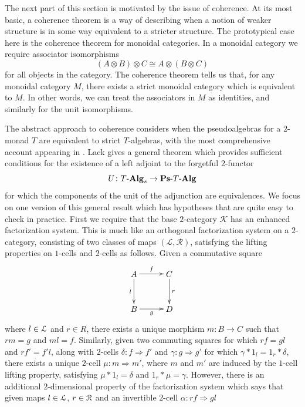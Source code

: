 The next part of this section is motivated by the issue of coherence. At its most basic, a coherence theorem is a way of describing when a notion of weaker structure is in some way equivalent to a stricter structure. The prototypical case here is the coherence theorem for monoidal categories. In a monoidal category we require associator isomorphisms
    \[
        \left( A \otimes B \right) \otimes C \cong A \otimes \left( B \otimes C \right)
    \]
for all objects in the category. The coherence theorem tells us that, for any monoidal category $M$, there exists a strict monoidal category which is equivalent to $M$. In other words, we can treat the associators in $M$ as identities, and similarly for the unit isomorphisms.

The abstract approach to coherence considers when the pseudoalgebras for a $2$-monad $T$ are equivalent to strict $T$-algebras, with the most comprehensive account appearing in \cite{lack-cod}. Lack gives a general theorem which provides sufficient conditions for the existence of a left adjoint to the forgetful $2$-functor
    \[
        U \colon T\mbox{-}\mathbf{Alg}_s \rightarrow \mathbf{Ps}\mbox{-}T\mbox{-}\mathbf{Alg}
    \]
for which the components of the unit of the adjunction are equivalences. We focus on one version of this general result which has hypotheses that are quite easy to check in practice. First we require that the base $2$-category $\mathcal{K}$ has an enhanced factorization system. This is much like an orthogonal factorization system on a $2$-category, consisting of two classes of maps $(\mathcal{L},\mathcal{R})$, satisfying the lifting properties on $1$-cells and $2$-cells as follows. Given a commutative square
     \[
        \xy
            (0,0)*+{A}="00";
            (15,0)*+{C}="10";
            (0,-15)*+{B}="01";
            (15,-15)*+{D}="11";
            {\ar^{f} "00" ; "10"};
            {\ar^{r} "10" ; "11"};
            {\ar_{l} "00" ; "01"};
            {\ar_{g} "01" ; "11"};
        \endxy
     \]
where $l \in \mathcal{L}$ and $r \in {R}$, there exists a unique morphism $m \colon B \rightarrow C$ such that $rm = g$ and $ml = f$. Similarly, given two commuting squares for which $rf = gl$ and $rf' = f'l$, along with $2$-cells $\delta \colon f \Rightarrow f'$ and $\gamma \colon g \Rightarrow g'$ for which $\gamma \ast 1_l = 1_r \ast \delta$, there exists a unique $2$-cell $\mu \colon m \Rightarrow m'$, where $m$ and $m'$ are induced by the $1$-cell lifting property, satisfying $\mu \ast 1_l = \delta$ and $1_r \ast \mu = \gamma$. However, there is an additional $2$-dimensional property of the factorization system which says that given maps $l \in \mathcal{L}$, $r \in \mathcal{R}$ and an invertible $2$-cell $\alpha \colon rf \Rightarrow gl$

